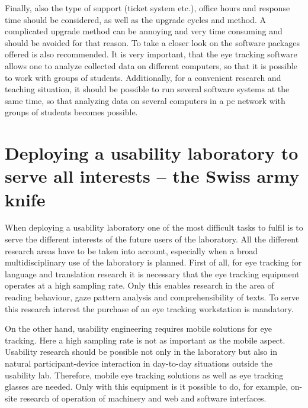 \begin{
}[h]
\begin{styleBodyTextIndent}
Finally, also the type of support (ticket system etc.), office hours and response time should be considered, as well as the upgrade cycles and method. A complicated upgrade method can be annoying and very time consuming and should be avoided for that reason. To take a closer look on the software packages offered is also recommended. It is very important, that the eye tracking software allows one to analyze collected data on different computers, so that it is possible to work with groups of students. Additionally, for a convenient research and teaching situation, it should be possible to run several software systems at the same time, so that analyzing data on several computers in a pc network with groups of students becomes possible.
\end{styleBodyTextIndent}

\section{Deploying a usability laboratory to serve all interests – the Swiss army knife }

When deploying a usability laboratory one of the most difficult tasks to fulfil is to serve the different interests of the future users of the laboratory. All the different research areas have to be taken into account, especially when a broad multidisciplinary use of the laboratory is planned. First of all, for eye tracking for language and translation research it is necessary that the eye tracking equipment operates at a high sampling rate. Only this enables research in the area of reading behaviour, gaze pattern analysis and comprehensibility of texts. To serve this research interest the purchase of an eye tracking workstation is mandatory.

\begin{styleBodyTextIndent}
On the other hand, usability engineering requires mobile solutions for eye tracking. Here a high sampling rate is not as important as the mobile aspect. Usability research should be possible not only in the laboratory but also in natural participant-device interaction in day-to-day situations outside the usability lab. Therefore, mobile eye tracking solutions as well as eye tracking glasses are needed. Only with this equipment is it possible to do, for example, on-site research of operation of machinery and web and software interfaces. 
\end{styleBodyTextIndent}


\end{
}
